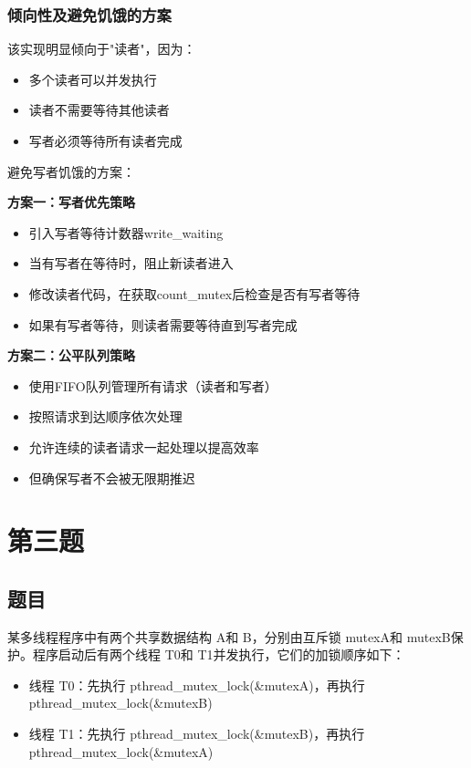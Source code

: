 \subsection{倾向性及避免饥饿的方案}

该实现明显倾向于"读者"，因为：
\begin{itemize}
    \item 多个读者可以并发执行
    \item 读者不需要等待其他读者
    \item 写者必须等待所有读者完成
\end{itemize}

避免写者饥饿的方案：

\textbf{方案一：写者优先策略}
\begin{itemize}
    \item 引入写者等待计数器write\_waiting
    \item 当有写者在等待时，阻止新读者进入
    \item 修改读者代码，在获取count\_mutex后检查是否有写者等待
    \item 如果有写者等待，则读者需要等待直到写者完成
\end{itemize}

\textbf{方案二：公平队列策略}
\begin{itemize}
    \item 使用FIFO队列管理所有请求（读者和写者）
    \item 按照请求到达顺序依次处理
    \item 允许连续的读者请求一起处理以提高效率
    \item 但确保写者不会被无限期推迟
\end{itemize}

\chapter{第三题}

\section{题目}

某多线程程序中有两个共享数据结构 A和 B，分别由互斥锁 mutexA和 mutexB保护。程序启动后有两个线程 T0和 T1并发执行，它们的加锁顺序如下：
\begin{itemize}
    \item 线程 T0：先执行 pthread\_mutex\_lock(\&mutexA)，再执行 pthread\_mutex\_lock(\&mutexB)
    \item 线程 T1：先执行 pthread\_mutex\_lock(\&mutexB)，再执行 pthread\_mutex\_lock(\&mutexA)
\end{itemize}


